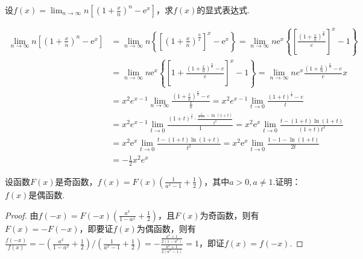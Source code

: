 \begin{xiti}
\begin{solution}
\end{solution}
\item 设$f ( x ) = \lim _ { n \rightarrow \infty } n \left[ \left( 1 + \frac { x } { n } \right) ^ { n } - \mathrm { e } ^ { x } \right]$，求$f(x)$的显式表达式.
\begin{solution}
	\begin{align*}
	\lim _{n \rightarrow \infty} n\left[\left(1+\frac{x}{n}\right)^{n}-\mathrm{e}^{x}\right]&=\lim _{n \rightarrow \infty} n\left\{\left[\left(1+\frac{x}{n}\right)^{\frac{n}{x}}\right]^{x}-\mathrm{e}^{x}\right\}=\lim _{n \rightarrow \infty} n \mathrm{e}^{x}\left\{\left[\frac{\left(1+\frac{x}{n}\right)^{\frac{n}{x}}}{e}\right]^{x}-1\right\}\\
	&=\lim _{n \rightarrow \infty} n \mathrm{e}^{x}\left\{\left[1+\frac{\left(1+\frac{x}{n}\right)^{\frac{n}{x}}-e}{e}\right]^x-1\right\}=\lim _{n \rightarrow \infty}ne^x \frac{\left(1+\frac{x}{n}\right)^{\frac{n}{x}}-e}{e} x\\
	&=x^{2} e^{x-1} \lim _{n \rightarrow \infty} \frac{\left(1+\frac{x}{n}\right)^{\frac{n}{x}}-e}{\frac{x}{n}}=x^{2} e^{x-1} \lim _{t \rightarrow 0} \frac{(1+t)^{\frac{1}{t}}-e}{t}\\
	&=x^{2} e^{x-1} \lim _{t \rightarrow 0} \frac{(1+t)^{\frac{1}{t}} \cdot\frac{ \frac{t}{1+t}-\ln (1+t)}{t^2}}{1}=x^{2} \mathrm{e}^{x} \lim _{t \rightarrow 0} \frac{t-(1+t) \ln (1+t)}{(1+t) t^{2}}\\
	&=x^{2} \mathrm{e}^{x} \lim _{t \rightarrow 0} \frac{t-(1+t) \ln (1+t)}{t^{2}}=x^{2} \mathrm{e}^{x} \lim _{t \rightarrow 0} \frac{1-1-\ln (1+t)}{2 t}\\
	&=-\frac{1}{2}x^{2}e^x
	\end{align*}
\end{solution}

\item 设函数$F(x)$是奇函数，$f ( x ) = F ( x ) \left( \frac { 1 } { a ^ { x } - 1 } + \frac { 1 } { 2 } \right)$，其中$a>0,a\ne 1$.证明：$f(x)$是偶函数.
\begin{proof}
	由$f\left(-x\right)=F\left(-x\right)\left(\frac{a^x}{1-a^x}+\frac{1}{2}\right)$，且$F(x)$为奇函数，则有$F(x)=-F(-x)$，即要证$f(x)$为偶函数，则有$\frac{f\left(-x\right)}{f\left(x\right)}=-\left(\frac{a^x}{1-a^x}+\frac{1}{2}\right)/\left(\frac{1}{a^x-1}+\frac{1}{2}\right)=-\frac{\frac{a^x+1}{2\left(1-a^x\right)}}{\frac{a^x+1}{2\left(a^x-1\right)}}=1$，即证$f(x)=f(-x)$.
	

\end{proof}
\end{xiti}
